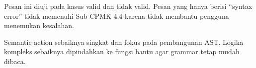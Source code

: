 Pesan ini diuji pada kasus valid dan tidak valid. Pesan yang hanya
berisi ``syntax error'' tidak memenuhi Sub-CPMK 4.4 karena tidak
membantu pengguna menemukan kesalahan.

\begin{infobox}
Semantic action sebaiknya singkat dan fokus pada pembangunan AST.
Logika kompleks sebaiknya dipindahkan ke fungsi bantu agar grammar
tetap mudah dibaca.
\end{infobox}
